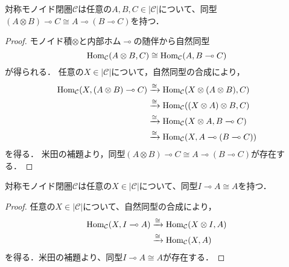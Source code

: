 \documentclass[type_judgement.tex]{subfiles}
\begin{document}
\begin{prop}
\label{prop:mc_adj}
対称モノイド閉圏$\mathcal{C}$は任意の$A,B,C\in|\mathcal{C}|$について、同型$(A \otimes B) \multimap C \cong A \multimap (B \multimap C)$を持つ．
\end{prop}
\begin{proof}
モノイド積$\otimes$と内部ホム$\multimap$の随伴から自然同型
\begin{equation*}
    \mathop{\mathrm{Hom}}\nolimits_\mathcal{C}(A \otimes B, C) \cong \mathop{\mathrm{Hom}}\nolimits_\mathcal{C}(A, B \multimap C)
\end{equation*}
が得られる．
任意の$X\in|\mathcal{C}|$について，自然同型の合成により，
\begin{align*}
    \mathop{\mathrm{Hom}}\nolimits_\mathcal{C}(X, (A \otimes B) \multimap C) &\xrightarrow{\cong} \mathop{\mathrm{Hom}}\nolimits_\mathcal{C}(X \otimes (A \otimes B), C) \\
     &\xrightarrow{\cong} \mathop{\mathrm{Hom}}\nolimits_\mathcal{C}((X \otimes A) \otimes B, C) \\
     &\xrightarrow{\cong} \mathop{\mathrm{Hom}}\nolimits_\mathcal{C}(X \otimes A, B \multimap C) \\
     &\xrightarrow{\cong} \mathop{\mathrm{Hom}}\nolimits_\mathcal{C}(X, A \multimap (B \multimap C))
\end{align*}
を得る．
米田の補題より，同型$(A \otimes B) \multimap C \cong A \multimap (B \multimap C)$が存在する．
\end{proof}

\begin{prop}
\label{prop:unit}
対称モノイド閉圏$\mathcal{C}$は任意の$X\in|\mathcal{C}|$について、同型$I \multimap A \cong A$を持つ．
\end{prop}
\begin{proof}
任意の$X\in|\mathcal{C}|$について、自然同型の合成により，
\begin{align*}
    \mathop{\mathrm{Hom}}\nolimits_\mathcal{C}(X, I \multimap A) &\xrightarrow{\cong} \mathop{\mathrm{Hom}}\nolimits_\mathcal{C}(X \otimes I, A) \\
    &\xrightarrow{\cong} \mathop{\mathrm{Hom}}\nolimits_\mathcal{C}(X, A)
\end{align*}
を得る．米田の補題より、同型$I \multimap A \cong A$が存在する．
\end{proof}
\end{document}

